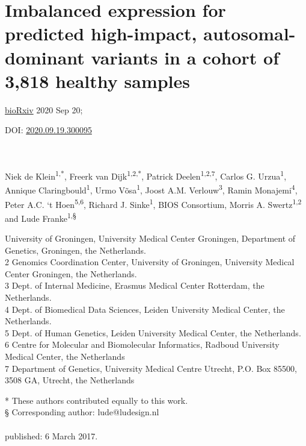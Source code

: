 \chapter[Imbalanced expression for predicted high-impact, autosomal-dominant variants in a cohort of 3,818 healthy samples]{Imbalanced expression for predicted high-impact, autosomal-dominant variants in a cohort of 3,818 healthy samples}

\label{chap:chapter3-ase}


\hfill \underline{bioRxiv} 2020 Sep 20;

\hfill DOI: \href{https://doi.org/10.1101/2020.09.19.300095}{2020.09.19.300095}


\noindent
\\
\\


Niek de Klein\textsuperscript{1,*}, Freerk van Dijk\textsuperscript{1,2,*}, Patrick Deelen\textsuperscript{1,2,7}, Carlos G. Urzua\textsuperscript{1}, Annique Claringbould\textsuperscript{1}, Urmo Võsa\textsuperscript{1}, Joost A.M. Verlouw\textsuperscript{3}, Ramin Monajemi\textsuperscript{4}, Peter A.C. ‘t Hoen\textsuperscript{5,6}, Richard J. Sinke\textsuperscript{1}, BIOS Consortium, Morris A. Swertz\textsuperscript{1,2} and Lude Franke\textsuperscript{1,§}


 University of Groningen, University Medical Center Groningen, Department of Genetics, Groningen, the Netherlands.\\
2 Genomics Coordination Center, University of Groningen, University Medical Center Groningen, the Netherlands.\\
3 Dept. of Internal Medicine, Erasmus Medical Center Rotterdam, the Netherlands.\\
4 Dept. of Biomedical Data Sciences, Leiden University Medical Center, the Netherlands.\\
5 Dept. of Human Genetics, Leiden University Medical Center, the Netherlands.\\
6 Centre for Molecular and Biomolecular Informatics, Radboud University Medical Center, the Netherlands\\
7 Department of Genetics, University Medical Centre Utrecht, P.O. Box 85500, 3508 GA, Utrecht, the Netherlands

* These authors contributed equally to this work.\\
§ Corresponding author: lude@ludesign.nl
\\
\\
\noindent
published: 6 March 2017.

